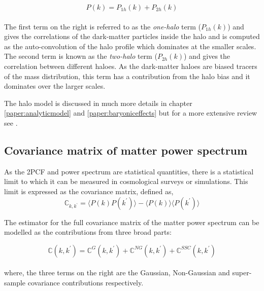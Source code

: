 \begin{equation}
	P(k) = P_{1h}(k)  + P_{2h}(k)
\end{equation}
\\
The first term on the right is referred to as the {\it one-halo} term ($P_{1h}(k)$) and gives
the correlations of the dark-matter particles inside the halo and is computed as
the auto-convolution of the halo profile which dominates at the smaller scales. 
The second term is known as the {\it two-halo}
term ($P_{2h}(k)$) and gives the correlation between different haloes. As the 
dark-matter haloes are biased tracers of the mass distribution, this term has a 
contribution from the halo bias and it dominates over the larger scales. 

The halo model is discussed in much more details in chapter \ref{paper:analyticmodel} 
and \ref{paper:baryoniceffects} but for a more extensive review see
\cite{2002PhR...372....1C}.


\subsection{Covariance matrix of matter power spectrum}
As the 2PCF and power spectrum are statistical quantities, there is a statistical limit
to which it can be measured in cosmological surveys or simulations. This limit is expressed
as the covariance matrix, defined as,
\begin{equation}
	\mathbb{C}_{k,k^{\prime}}	= 
			\langle P(k)P(k^{\prime}) \rangle - 
			\langle P(k)\rangle \langle P(k^{\prime})\rangle
\end{equation}

The estimator for the full covariance matrix of the matter power spectrum 
can be modelled as the contributions from three broad parts:

\begin{equation}
	\mathbb{C}(k,k^{\prime}) = \mathbb{C}^{G}(k,k^{\prime}) + 
								\mathbb{C}^{NG}(k,k^{\prime}) + 
								\mathbb{C}^{SSC}(k,k^{\prime})
\end{equation}
\\
where, the three terms on the right are the Gaussian, Non-Gaussian and super-sample covariance contributions respectively. 

